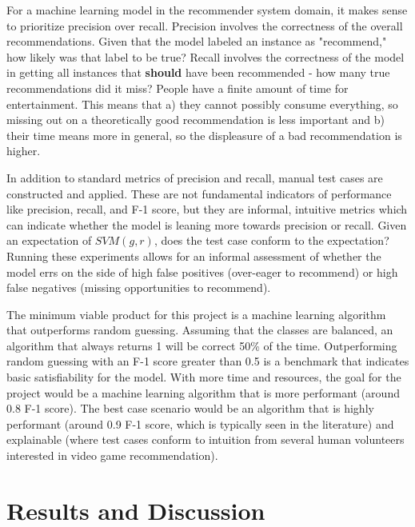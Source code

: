 \documentclass[10pt,twocolumn]{article}
\begin{document}
For a machine learning model in the recommender system domain, it makes sense to prioritize precision over recall. Precision involves the correctness of the overall recommendations. Given that the model labeled an instance as "recommend," how likely was that label to be true? Recall involves the correctness of the model in getting all instances that \textbf{should} have been recommended - how many true recommendations did it miss? People have a finite amount of time for entertainment. This means that a) they cannot possibly consume everything, so missing out on a theoretically good recommendation is less important and b) their time means more in general, so the displeasure of a bad recommendation is higher. 

In addition to standard metrics of precision and recall, manual test cases are constructed and applied. These are not fundamental indicators of performance like precision, recall, and F-1 score, but they are informal, intuitive metrics which can indicate whether the model is leaning more towards precision or recall. Given an expectation of $SVM(g, r)$, does the test case conform to the expectation? Running these experiments allows for an informal assessment of whether the model errs on the side of high false positives (over-eager to recommend) or high false negatives (missing opportunities to recommend).

The minimum viable product for this project is a machine learning algorithm that outperforms random guessing. Assuming that the classes are balanced, an algorithm that always returns 1 will be correct 50\% of the time. Outperforming random guessing with an F-1 score greater than 0.5 is a benchmark that indicates basic satisfiability for the model. With more time and resources, the goal for the project would be a machine learning algorithm that is more performant (around 0.8 F-1 score). The best case scenario would be an algorithm that is highly performant (around 0.9 F-1 score, which is typically seen in the literature) and explainable (where test cases conform to intuition from several human volunteers interested in video game recommendation).

\section{Results and Discussion}

\end{document}
